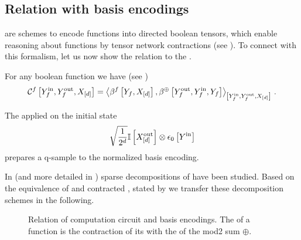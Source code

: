 \subsection{Relation with basis encodings}

\BasisEncodings{} are schemes to encode functions into directed boolean tensors, which enable reasoning about functions by tensor network contractions (see \cite{goessmann_tensor_2026}).
To connect with this formalism, let us now show the relation to the \computationCircuits{}.

\begin{lemma}
    \label{lem:bencComCircuit}
    For any boolean function we have (see )
    \begin{align*}
        \qcbencodingofat{\exformula}{\cheadvariableof{\exformula}{\insymbol},\cheadvariableof{\exformula}{\outsymbol},\shortcatvariables}
        = \contractionof{
            \bencodingofat{\exformula}{\headvariableof{\exformula},\shortcatvariables},
            \bencodingofat{\oplus}{\cheadvariableof{\exformula}{\outsymbol},\cheadvariableof{\exformula}{\insymbol},\headvariableof{\exformula}}
        }{\cheadvariableof{\exformula}{\insymbol},\cheadvariableof{\exformula}{\outsymbol},\shortcatvariables} \, .
    \end{align*}
\end{lemma}

The \computationCircuit{} applied on the initial state
\begin{align*}
    \sqrt{\frac{1}{2^{d}}} \mathbb{I}\left[X_{[d]}^{\mathrm{out}}\right] \otimes \epsilon_{0}\left[Y^{\mathrm{in}}\right]
\end{align*}
prepares a q-sample to the normalized basis encoding. %


In \cite{goessmann_tensor_2026} (and more detailed in \cite{goessmann_tensor-network_2025}) sparse decompositions of \basisEncodings{} have been studied.
Based on the equivalence of \computationCircuits{} and contracted \basisEncodings{}, stated by  we transfer these decomposition schemes in the following.

\begin{figure}[t]
    \begin{center}
        
    \end{center}
    \caption{Relation of computation circuit and basis encodings.
    The \computationCircuit{} of a function is the contraction of its \basisEncoding{} with the \basisEncoding{} of the mod2 sum $\oplus$.}
    \label{fig:bencComCircuit}
\end{figure}

